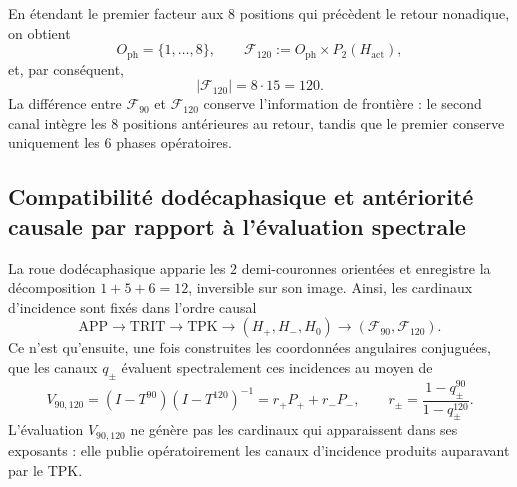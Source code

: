 En étendant le premier facteur aux \(8\) positions qui précèdent le retour
nonadique, on obtient
\[
 O_{\mathrm{ph}}=\{1,\ldots,8\},
 \qquad
 \mathcal F_{120}
 :=O_{\mathrm{ph}}\times P_2(H_{\mathrm{act}}),
\]
et, par conséquent,
\[
 |\mathcal F_{120}|=8\cdot15=120.
\]
La différence entre \(\mathcal F_{90}\) et \(\mathcal F_{120}\) conserve
l'information de frontière : le second canal intègre les \(8\) positions
antérieures au retour, tandis que le premier conserve uniquement les
\(6\) phases opératoires.

\subsection{Compatibilité dodécaphasique et antériorité causale par rapport à l'évaluation spectrale}

La roue dodécaphasique apparie les \(2\) demi-couronnes orientées et enregistre la
décomposition \(1+5+6=12\), inversible sur son image. Ainsi, les cardinaux
d'incidence sont fixés dans l'ordre causal
\[
 \mathrm{APP}\longrightarrow\mathrm{TRIT}\longrightarrow\mathrm{TPK}
 \longrightarrow(H_+,H_-,H_0)
 \longrightarrow(\mathcal F_{90},\mathcal F_{120}).
\]
Ce n'est qu'ensuite, une fois construites les coordonnées angulaires conjuguées, que les
canaux \(q_\pm\) évaluent spectralement ces incidences au moyen de
\[
 V_{90,120}
 =(I-T^{90})(I-T^{120})^{-1}
 =r_+P_++r_-P_-,
 \qquad
 r_\pm=\frac{1-q_\pm^{90}}{1-q_\pm^{120}}.
\]
L'évaluation \(V_{90,120}\) ne génère pas les cardinaux qui apparaissent dans ses
exposants : elle publie opératoirement les canaux d'incidence produits
auparavant par le TPK.
